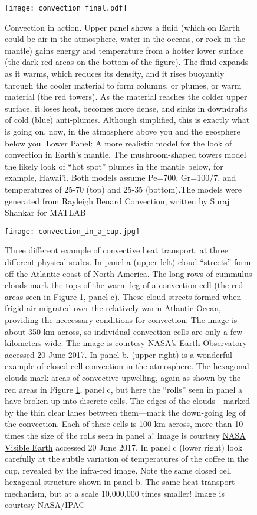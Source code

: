 \documentclass[amstex,12pt]{book}
\begin{document}
\begin{figure}[p]
\centering
\texttt{[image: convection\_final.pdf]}%
\caption{Convection in action. Upper panel shows a fluid (which on Earth could be air in the atmosphere, water in the oceans, or rock in the mantle) gains energy and temperature from a hotter lower surface (the dark red areas on the bottom of the figure). The fluid expands as it warms, which reduces its density, and it rises buoyantly through the cooler material to form columns, or plumes, or warm material (the red towers). As the material reaches the colder upper surface, it loses heat, becomes more dense, and sinks in downdrafts of cold (blue) anti-plumes. Although simplified, this is exactly what is going on, now, in the atmosphere above you and the geosphere below you. Lower Panel: A more realistic model for the look of convection in Earth’s mantle. The mushroom-shaped towers model the likely look of ``hot spot'' plumes in the mantle below, for example, Hawai'i. Both models assume Pe=700, Gr=100/7, and temperatures of 25-70 (top) and 25-35 (bottom).The models were generated from Rayleigh Benard Convection, written by Suraj Shankar for MATLAB}
\label{fig:convection_final}
\end{figure}

\begin{figure}[p]
\centering
\texttt{[image: convection\_in\_a\_cup.jpg]}%
\caption{Three different example of convective heat transport, at three different physical scales. In panel a (upper left) cloud ``streets'' form off the Atlantic coast of North America. The long rows of cummulus clouds mark the tops of the warm leg of a convection cell (the red areas seen in Figure \ref{fig:convection_final}, panel c). These cloud streets formed when frigid air migrated over the relatively warm Atlantic Ocean, providing the neccessary conditions for convection. The image is about 350 km across, so individual convection cells are only a few kilometers wide. The image is courtesy \href{https://earthobservatory.nasa.gov/NaturalHazards/view.php?id=82800}{NASA's Earth Observatory} accessed 20 June 2017. In panel b. (upper right) is a wonderful example of closed cell convection in the atmosphere. The hexagonal clouds mark areas of convective upwelling, again as shown by the red areas in Figure \ref{fig:convection_final}, panel c, but here the ``rolls'' seen in panel a have broken up into discrete cells. The edges of the clouds---marked by the thin clear lanes between them---mark the down-going leg of the convection. Each of these cells is 100 km across, more than 10 times the size of the rolls seen in panel a! Image is courtesy \href{https://visibleearth.nasa.gov/view.php?id=59758}{NASA Visible Earth} accessed 20 June 2017. In panel c (lower right) look carefully at the subtle variation of temperatures of the coffee in the cup, revealed by the infra-red image. Note the same closed cell hexagonal structure shown in panel b. The same heat transport mechanism, but at a scale 10,000,000 times smaller! Image is courtesy \href{http://coolcosmos.ipac.caltech.edu/cosmic_kids/learn_ir/}{NASA/IPAC}}
\label{fig:convection_in_a_cup}
\end{figure}
\end{document}
